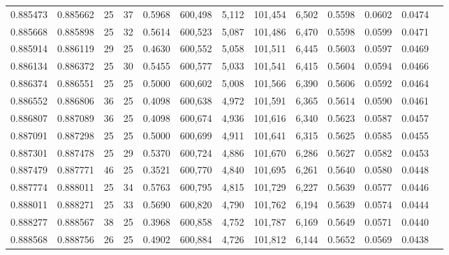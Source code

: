 \begin{tabular}{rrrrrrrrrrrrr}
0.885473 & 0.885662 &    25 &  37 &                                     0.5968 & 600,498 &   5,112 & 101,454 &   6,502 & 0.5598 & 0.0602 & 0.0474 \\
0.885668 & 0.885898 &    25 &  32 &                                     0.5614 & 600,523 &   5,087 & 101,486 &   6,470 & 0.5598 & 0.0599 & 0.0471 \\
0.885914 & 0.886119 &    29 &  25 &                                     0.4630 & 600,552 &   5,058 & 101,511 &   6,445 & 0.5603 & 0.0597 & 0.0469 \\
0.886134 & 0.886372 &    25 &  30 &                                     0.5455 & 600,577 &   5,033 & 101,541 &   6,415 & 0.5604 & 0.0594 & 0.0466 \\
0.886374 & 0.886551 &    25 &  25 &                                     0.5000 & 600,602 &   5,008 & 101,566 &   6,390 & 0.5606 & 0.0592 & 0.0464 \\
0.886552 & 0.886806 &    36 &  25 &                                     0.4098 & 600,638 &   4,972 & 101,591 &   6,365 & 0.5614 & 0.0590 & 0.0461 \\
0.886807 & 0.887089 &    36 &  25 &                                     0.4098 & 600,674 &   4,936 & 101,616 &   6,340 & 0.5623 & 0.0587 & 0.0457 \\
0.887091 & 0.887298 &    25 &  25 &                                     0.5000 & 600,699 &   4,911 & 101,641 &   6,315 & 0.5625 & 0.0585 & 0.0455 \\
0.887301 & 0.887478 &    25 &  29 &                                     0.5370 & 600,724 &   4,886 & 101,670 &   6,286 & 0.5627 & 0.0582 & 0.0453 \\
0.887479 & 0.887771 &    46 &  25 &                                     0.3521 & 600,770 &   4,840 & 101,695 &   6,261 & 0.5640 & 0.0580 & 0.0448 \\
0.887774 & 0.888011 &    25 &  34 &                                     0.5763 & 600,795 &   4,815 & 101,729 &   6,227 & 0.5639 & 0.0577 & 0.0446 \\
0.888011 & 0.888271 &    25 &  33 &                                     0.5690 & 600,820 &   4,790 & 101,762 &   6,194 & 0.5639 & 0.0574 & 0.0444 \\
0.888277 & 0.888567 &    38 &  25 &                                     0.3968 & 600,858 &   4,752 & 101,787 &   6,169 & 0.5649 & 0.0571 & 0.0440 \\
0.888568 & 0.888756 &    26 &  25 &                                     0.4902 & 600,884 &   4,726 & 101,812 &   6,144 & 0.5652 & 0.0569 & 0.0438 \\

\end{tabular}
